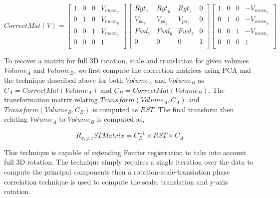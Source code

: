 \begin{equation} \label{eqn:CorrectUpMat}
CorrectMat(V) = \left[
\begin{array}{cccc}
1 & 0 & 0 & V_{mean_x} \\
0 & 1 & 0 & V_{mean_y} \\
0 & 0 & 1 & V_{mean_z} \\
0 & 0 & 0 & 1 \\
\end{array}
\right] \left[
\begin{array}{cccc}
Rgt_x & Rgt_y & Rgt_z & 0 \\
V_{pa_x} & V_{pa_y} & V_{pa_z} & 0 \\
Fwd_x & Fwd_y & Fwd_z & 0 \\
0 & 0 & 0 & 1 \\
\end{array}
\right] \left[
\begin{array}{cccc}
1 & 0 & 0 & -V_{mean_x} \\
0 & 1 & 0 & -V_{mean_y} \\
0 & 0 & 1 & -V_{mean_z} \\
0 & 0 & 0 & 1 \\
\end{array}
\right]
\end{equation}


To recover a matrix for full 3D rotation, scale and translation for given volumes $Volume_A$ and $Volume_B$, we first compute the correction matrices using PCA and the technique described above for both $Volume_A$ and $Volume_B$ as $C_A = CorrectMat(Volume_A)$ and $C_B = CorrectMat(Volume_B)$. The transformation matrix relating $Transform(Volume_A, C_A)$ and $Transform(Volume_B, C_B)$ is computed as $RST$. The final transform then relating $Volume_A$ to $Volume_B$ is computed as,

\begin{equation} \label{eqn:FullRSTTransform}
R_{x,y,z}ST Matrix = C_{B}^{-1} \times RST \times C_A
\end{equation}

This technique is capable of extending Fourier registration to take into account full 3D rotation. The technique simply requires a single iteration over the data to compute the principal components then a rotation-scale-translation phase correlation technique is used to compute the scale, translation and y-axis rotation. 